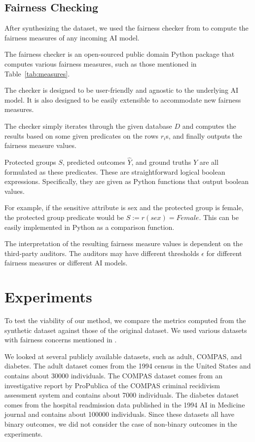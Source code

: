 \documentclass[manuscript,screen,review,anonymous]{acmart}
\newcommand{\db}{D}
\begin{document}
\subsection{Fairness Checking}

After synthesizing the dataset, we used the fairness checker from \cite{yuan2024ensuring} to compute the fairness measures of any incoming AI model.

The fairness checker is an open-sourced public domain Python package that computes various fairness measures, such as those mentioned in Table~\ref{tab:measures}.

The checker is designed to be user-friendly and agnostic to the underlying AI model. It is also designed to be easily extensible to accommodate new fairness measures.

The checker simply iterates through the given database $\db$ and computes the results based on some given predicates on the rows $r_i$s, and finally outputs the fairness measure values.

Protected groups $S$, predicted outcomes $\hat{Y}$, and ground truths $Y$ are all formulated as these predicates. These are straightforward logical boolean expressions. Specifically, they are given as Python functions that output boolean values.

For example, if the sensitive attribute is sex and the protected group is female, the protected group predicate would be $S := r(sex) = Female$. This can be easily implemented in Python as a comparison function.

The interpretation of the resulting fairness measure values is dependent on the third-party auditors. The auditors may have different thresholds $\epsilon$ for different fairness measures or different AI models.

\section{Experiments}

To test the viability of our method, we compare the metrics computed from the synthetic dataset against those of the original dataset. We used various datasets with fairness concerns mentioned in \cite{pessach2022review}.

We looked at several publicly available datasets, such as adult\cite{adult_2,Kaggle_Adult_Census_Income}, COMPAS\cite{larson2016propublica,Kaggle_COMPAS_Dataset}, and diabetes\cite{diabetes_34,Kaggle_Diabetes_Prediction}. The adult dataset comes from the 1994 census in the United States and contains about 30000 individuals. The COMPAS dataset comes from an investigative report by ProPublica of the COMPAS criminal recidivism assessment system and contains about 7000 individuals. The diabetes dataset comes from the hospital readmission data published in the 1994 AI in Medicine journal and contains about 100000 individuals. Since these datasets all have binary outcomes, we did not consider the case of non-binary outcomes in the experiments.
\end{document}
